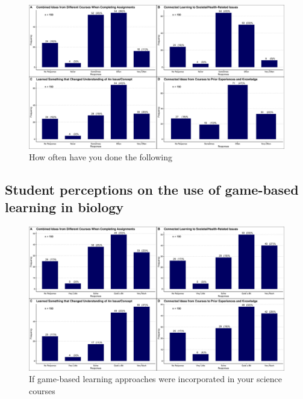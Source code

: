 \documentclass{article}
\begin{document}
\begin{figure}[H]
	\includegraphics[width=\textwidth]{figures_4f06/how_often_haveyou_done_thefollowing.jpg}
	\caption{How often have you done the following}
	\label{fig:4}
\end{figure}

\subsection{Student perceptions on the use of game-based learning in biology}

\begin{figure}[H]
	\includegraphics[width=\textwidth]{figures_4f06/how_does_gbl_help_in_science.jpg}
	\caption{If game-based learning approaches were incorporated in your science courses}
	\label{fig:5}
\end{figure}
\end{document}
